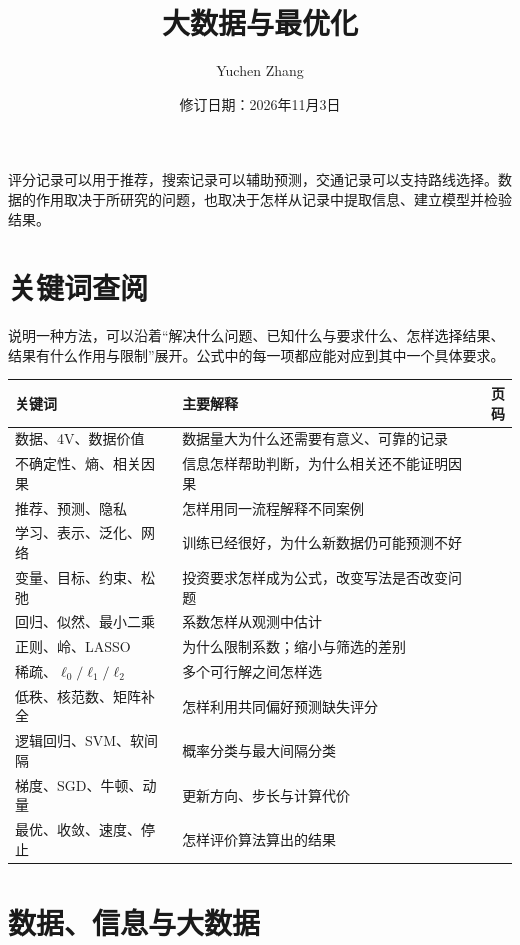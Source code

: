 \documentclass[UTF8,fontset=fandol,a4paper,12pt]{ctexart}
\title{大数据与最优化}
\author{Yuchen Zhang}
\date{修订日期：2026年11月3日}
\makeatletter
\theoremstyle{definition}
\renewcommand{\maketitle}{\begin{center}
{\LARGE\bfseries\@title\par}\vspace{0.6em}
\@author\par\vspace{0.2em}{\small\@date\par}
\end{center}}
\makeatother
\begin{document}
\maketitle
评分记录可以用于推荐，搜索记录可以辅助预测，交通记录可以支持路线选择。数据的作用取决于所研究的问题，也取决于怎样从记录中提取信息、建立模型并检验结果。
\section*{关键词查阅}
说明一种方法，可以沿着“解决什么问题、已知什么与要求什么、怎样选择结果、结果有什么作用与限制”展开。公式中的每一项都应能对应到其中一个具体要求。
\begin{center}
\begin{tabular}{p{}p{}r}
\toprule
关键词 & 主要解释 & 页码\\
\midrule
数据、4V、数据价值 & 数据量大为什么还需要有意义、可靠的记录 & \pageref{sec:data}\\
不确定性、熵、相关因果 & 信息怎样帮助判断，为什么相关还不能证明因果 & \pageref{sec:thinking}\\
推荐、预测、隐私 & 怎样用同一流程解释不同案例 & \pageref{sec:cases}\\
学习、表示、泛化、网络 & 训练已经很好，为什么新数据仍可能预测不好 & \pageref{sec:ml}\\
变量、目标、约束、松弛 & 投资要求怎样成为公式，改变写法是否改变问题 & \pageref{sec:model}\\
回归、似然、最小二乘 & 系数怎样从观测中估计 & \pageref{sec:regression}\\
正则、岭、LASSO & 为什么限制系数；缩小与筛选的差别 & \pageref{sub:regularization}\\
稀疏、$\ell_0/\ell_1/\ell_2$ & 多个可行解之间怎样选 & \pageref{sec:sparse}\\
低秩、核范数、矩阵补全 & 怎样利用共同偏好预测缺失评分 & \pageref{sec:lowrank}\\
逻辑回归、SVM、软间隔 & 概率分类与最大间隔分类 & \pageref{sec:classification}\\
梯度、SGD、牛顿、动量 & 更新方向、步长与计算代价 & \pageref{sec:algorithms}\\
最优、收敛、速度、停止 & 怎样评价算法算出的结果 & \pageref{sec:convergence}\\
\bottomrule
\end{tabular}
\end{center}
\clearpage

\section{数据、信息与大数据}\label{sec:data}
\end{document}
